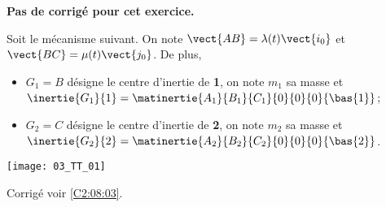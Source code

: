 \normaltrue
\correctionfalse



\setcounter{numques}{0}
\ifcorrection
\else
\textbf{Pas de corrigé pour cet exercice.}
\fi

\ifprof
\else
Soit le mécanisme suivant. On note $\vect{AB}=\lambda(t)\vect{i_0}$ et $\vect{BC}=\mu(t)\vect{j_0}$. De plus, 
\begin{itemize}
\item $G_1 = B$ désigne le centre d'inertie de \textbf{1}, on note $m_1$ sa masse et $\inertie{G_1}{1}=\matinertie{A_1}{B_1}{C_1}{0}{0}{0}{\bas{1}}$; 
\item $G_2 = C$ désigne le centre d'inertie de \textbf{2}, on note $m_2$ sa masse et $\inertie{G_2}{2}=\matinertie{A_2}{B_2}{C_2}{0}{0}{0}{\bas{2}}$.
\end{itemize}
\begin{center}
\texttt{[image: 03\_TT\_01]}
\end{center}
\fi

\ifprof
\else
\fi

\ifprof
\else
\fi

\ifprof
\else
\fi

\ifprof
\else
\begin{flushright}
\footnotesize{Corrigé  voir \ref{C2:08:03}.}
\end{flushright}%
\fi